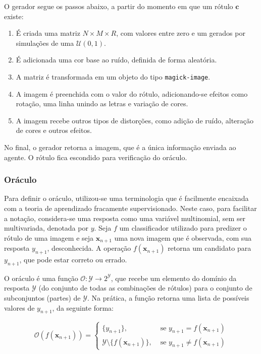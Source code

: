 \documentclass[12pt,twoside,brazilian]{book}
\providecommand{\tightlist}{%
  \setlength{\itemsep}{0pt}\setlength{\parskip}{0pt}}
\begin{document}
O gerador segue os passos abaixo, a partir do momento em que um rótulo
\(\mathbf c\) existe:

\begin{enumerate}
\def\labelenumi{\arabic{enumi}.}
\tightlist
\item
  É criada uma matriz \(N\times M \times R\), com valores entre zero e
  um gerados por simulações de uma \(\mathcal U(0,1)\).
\item
  É adicionada uma cor base ao ruído, definida de forma aleatória.
\item
  A matriz é transformada em um objeto do tipo \texttt{magick-image}.
\item
  A imagem é preenchida com o valor do rótulo, adicionando-se efeitos
  como rotação, uma linha unindo as letras e variação de cores.
\item
  A imagem recebe outros tipos de distorções, como adição de ruído,
  alteração de cores e outros efeitos.
\end{enumerate}

No final, o gerador retorna a imagem, que é a única informação enviada
ao agente. O rótulo fica escondido para verificação do oráculo.

\hypertarget{sec-oraculo}{%
\subsubsection{Oráculo}\label{sec-oraculo}}

Para definir o oráculo, utilizou-se uma terminologia que é facilmente
encaixada com a teoria de aprendizado fracamente supervisionado. Neste
caso, para facilitar a notação, considera-se uma resposta como uma
variável multinomial, sem ser multivariada, denotada por \(y\). Seja
\(f\) um classificador utilizado para predizer o rótulo de uma imagem e
seja \(\mathbf x_{n+1}\) uma nova imagem que é observada, com sua
resposta \(y_{n+1}\), desconhecida. A operação \(f(\mathbf x_{n+1})\)
retorna um candidato para \(y_{n+1}\), que pode estar correto ou errado.

O oráculo é uma função
\(\mathcal O: \mathcal Y \rightarrow 2^{\mathcal Y}\), que recebe um
elemento do domínio da resposta \(\mathcal Y\) (do conjunto de todas as
combinações de rótulos) para o conjunto de subconjuntos (partes) de
\(\mathcal Y\). Na prática, a função retorna uma lista de possíveis
valores de \({y}_{n+1}\), da seguinte forma:

\[
\mathcal O(f(\mathbf x_{n+1})) = \left\{\begin{array}{ll}
    \{ y_{n+1}\}, & \text{ se } y_{n+1} = f(\mathbf x_{n+1})  \\
    \mathcal Y \setminus \{f(\mathbf x_{n+1})\}, & \text{ se } y_{n+1} \neq f(\mathbf x_{n+1})
\end{array}\right.
\]
\end{document}
